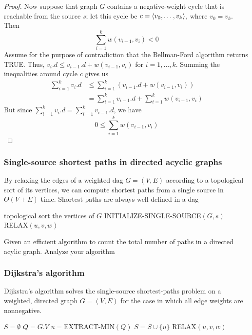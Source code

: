 \documentclass[11pt]{article}
\begin{document}
\begin{proof}
Now suppose that graph \(G\) contains a negative-weight cycle that is reachable from the
source \(s\); let this cycle be \(c=\langle v_0,\dots,v_k\rangle\), where \(v_0=v_k\). Then
\begin{equation*}
\sum_{i=1}^kw(v_{i-1},v_i)<0
\end{equation*}
Assume for the purpose of contradiction that the Bellman-Ford algorithm returns TRUE.
Thus, \(v_i.d\le v_{i-1}.d+w(v_{i-1},v_i)\) for \(i=1,\dots,k\). Summing the inequalities around
cycle \(c\) gives us
\begin{align*}
\sum_{i=1}^kv_i.d&\le\sum_{i=1}^k(v_{i-1}.d+w(v_{i-1},v_i))\\
&=\sum_{i=1}^kv_{i-1}.d+\sum_{i=1}^kw(v_{i-1},v_i)
\end{align*}
But since \(\sum_{i=1}^kv_i.d=\sum_{i=1}^kv_{i-1}.d\), we have
\begin{equation*}
0\le\sum_{i=1}^kw(v_{i-1},v_i)
\end{equation*}
\end{proof}

\begin{exercise}

\end{exercise}
\subsubsection{Single-source shortest paths in directed acyclic graphs}
\label{sec:orgc67f19d}
By relaxing the edges of a weighted dag \(G=(V,E)\) according to a topological sort of its
vertices, we can compute shortest paths from a single source in \(\Theta(V+E)\) time. Shortest paths
are always well defined in a dag

\begin{algorithmic}[1]
\State topological sort the vertices of \(G\)
\State INITIALIZE-SINGLE-SOURCE\((G,s)\)
        RELAX\((u,v,w)\)
    \EndFor
\EndFor
\EndProcedure
\end{algorithmic}

\begin{exercise}[24.2-4]
Given an efficient algorithm to count the total number of paths in a directed acylic graph.
Analyze your algorithm
\end{exercise}
\subsubsection{Dijkstra's algorithm}
\label{sec:org888fca0}
Dijkstra's algorithm solves the single-source shortest-paths problem on a weighted, directed
graph \(G=(V,E)\) for the case in which all edge weights are nonnegative.
\begin{algorithmic}[1]
\State \(S=\emptyset\)
\State \(Q=G.V\)
    \State \(u=\)EXTRACT-MIN\((Q)\)
    \State \(S=S\cup\{u\}\)
        RELAX\((u,v,w)\)
    \EndFor
\EndWhile
\EndProcedure
\end{algorithmic}
\end{document}
